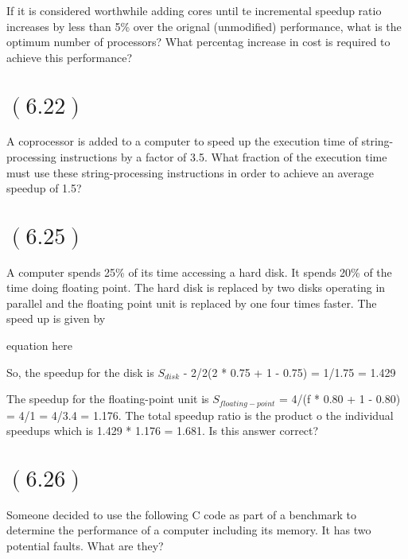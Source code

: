 \documentclass[letterpaper,12pt,titlepage]{article}
\begin{document}
If it is considered worthwhile adding cores until te incremental speedup ratio increases by less than 5\% over the orignal (unmodified) performance, what is the optimum number of processors? What percentag increase in cost is required to achieve this performance?

\begin{mdframed}[style=MyFrame]
\end{mdframed}

\section*{$(6.22)$} A coprocessor is added to a computer to speed up the execution time of string-processing instructions by a factor of 3.5. What fraction of the execution time must use these string-processing instructions in order to achieve an average speedup of 1.5?

\begin{mdframed}[style=MyFrame]
\end{mdframed}

\section*{$(6.25)$} A computer spends 25\% of its time accessing a hard disk. It spends 20\% of the time doing floating point. The hard disk is replaced by two disks operating in parallel and the floating point unit is replaced by one four times faster. The speed up is given by

equation here

So, the speedup for the disk is $S_{disk}$ - 2/2(2 * 0.75 + 1 - 0.75) = 1/1.75 = 1.429

The speedup for the floating-point unit is $S_{floating-point}$ = 4/(f * 0.80 + 1 - 0.80) = 4/1 = 4/3.4 = 1.176. The total speedup ratio is the product o the individual speedups which is 1.429 * 1.176 = 1.681. Is this answer correct?

\begin{mdframed}[style=MyFrame]
\end{mdframed}

\section*{$(6.26)$} Someone decided to use the following C code as part of a benchmark to determine the performance of a computer including its memory. It has two potential faults. What are they?
\end{document}
